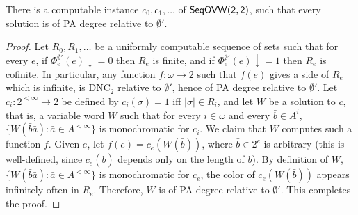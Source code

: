 \begin{theorem}
There is a computable instance $c_0, c_1, \dots$ of $\mathsf{Seq}\sf{OVW}(2,2)$,
such that every solution is of PA degree relative to $\emptyset'$.
\end{theorem}
\begin{proof}
Let $R_0, R_1, \dots$ be a uniformly computable sequence of sets
such that for every $e$,
if $\Phi^{\emptyset'}_e(e) \downarrow = 0$ then $R_e$ is finite,
and if $\Phi^{\emptyset'}_e(e) \downarrow = 1$ then $R_e$ is cofinite.
In particular, any function $f : \omega \to 2$ such that $f(e)$ gives
a side of $R_e$ which is infinite, is DNC$_2$ relative to $\emptyset'$,
hence of PA degree relative to $\emptyset'$.
Let $c_i : 2^{<\infty} \to 2$ be defined by $c_i(\sigma) = 1$ iff $|\sigma| \in R_i$, and let $W$ be a solution to $\bar c$, that is, a variable word $W$ such that for every $i \in \omega$ and every $\bar b \in A^i$, $\{W(\bar b\bar a) : \bar a \in A^{<\infty}\}$ is monochromatic for $c_i$.
We claim that $W$ computes such a function $f$.
Given $e$, let $f(e) = c_e(W(\bar b))$, where $\bar b  \in 2^e$ is arbitrary (this is well-defined, since $c_e(\bar b)$ depends only on the length of $\bar b$). By definition of $W$, $\{W(\bar b\bar a) : \bar a \in A^{<\infty}\}$ is monochromatic for $c_e$, the color of $c_e(W(\bar b))$ appears infinitely often in $R_e$. Therefore, $W$ is of PA degree relative to $\emptyset'$. This completes the proof.
\end{proof}
